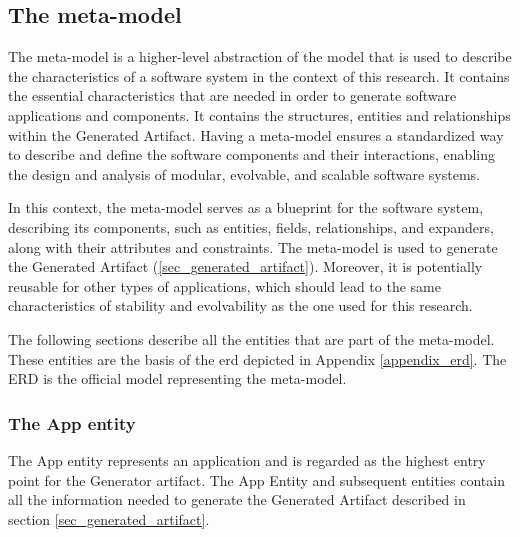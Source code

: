 \subsection{The meta-model} \label{sec_artifact_meta_model}

The meta-model is a higher-level abstraction of the model that is used to describe the
characteristics of a software system in the context of this research. It contains the
essential characteristics that are needed in order to generate software applications and
components. It contains the structures, entities and relationships within the Generated
Artifact. Having a meta-model ensures a standardized way to describe and define the
software components and their interactions, enabling the design and analysis of modular,
evolvable, and scalable software systems.

In this context, the meta-model serves as a blueprint for the software system, describing
its components, such as entities, fields, relationships, and expanders, along with their
attributes and constraints. The meta-model is used to generate the Generated Artifact
(\ref{sec_generated_artifact}). Moreover, it is potentially reusable for other types of
applications, which should lead to the same characteristics of stability and evolvability as
the one used for this research. 

The following sections describe all the entities that are part of the meta-model. These
entities are the basis of the \gls{erd} depicted in Appendix \ref{appendix_erd}. The ERD
is the official model representing the meta-model.

\subsubsection{The App entity}

The App entity represents an application and is regarded as the highest entry point for the
Generator artifact. The App Entity and subsequent entities contain all the information
needed to generate the Generated Artifact described in section \ref{sec_generated_artifact}. 

